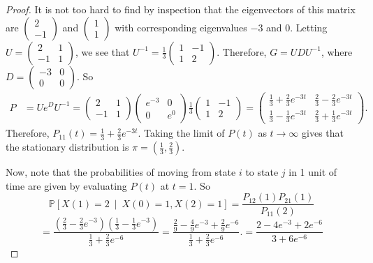 \documentclass[12pt]{article}
\newcommand{\p}{\mathbb{P}}
\newcommand{\given}{\ \mid \ }
\theoremstyle{definition}
\begin{document}
\begin{proof}
It is not too hard to find by inspection that the eigenvectors of this matrix are
$
\begin{pmatrix}
2 \\ -1
\end{pmatrix}
$
and
$
\begin{pmatrix}
1 \\ 1
\end{pmatrix}
$
with corresponding eigenvalues $-3$ and $0$.  Letting $U = 
\begin{pmatrix}
2 & 1 \\
-1 & 1
\end{pmatrix}
$, we see that $ U^{-1} = 
\frac{1}{3}
\begin{pmatrix}
1 & -1 \\
1 & 2
\end{pmatrix}
$.  Therefore, $G = UDU^{-1}$, where $D =
\begin{pmatrix}
-3 & 0 \\
0 & 0
\end{pmatrix}$.  So
\begin{align*}
P &= U e^D U^{-1} =
\begin{pmatrix}
2 & 1 \\
-1 & 1
\end{pmatrix}
\begin{pmatrix}
e^{-3} & 0 \\
0 & e^0
\end{pmatrix}
\frac{1}{3}
\begin{pmatrix}
1 & -1 \\
1 & 2
\end{pmatrix}
=
\begin{pmatrix}
\frac13 + \frac23 e^{-3t} & \frac23 - \frac23 e^{-3t} \\
\frac13 - \frac13 e^{-3t} & \frac23 + \frac13 e^{-3t}
\end{pmatrix}.
\end{align*}
Therefore, $P_{11}(t) = \frac13 + \frac23 e^{-3t}$.  Taking the limit of $P(t)$ as $t \rightarrow \infty$ gives that the stationary distribution is $\pi = \left( \frac13 , \frac23 \right)$.

Now, note that the probabilities of moving from state $i$ to state $j$ in 1 unit of time are given by evaluating $P(t)$ at $t=1$.  So
$$
\p[X(1) = 2 \given X(0) = 1, X(2) = 1] = 
\dfrac{P_{12}(1) P_{21}(1)}{P_{11}(2)}
$$
$$
= \dfrac{\left( \frac23 - \frac23 e^{-3} \right)\left( \frac13 - \frac13 e^{-3} \right) }{\frac13 + \frac23 e^{-6}}
= \dfrac{\frac29 - \frac49 e^{-3} + \frac29 e^{-6}}{\frac13 + \frac23 e^{-6}}.
= \dfrac{2 - 4 e^{-3} + 2 e^{-6}}{3 + 6 e^{-6}}
$$
\end{proof}
\end{document}
